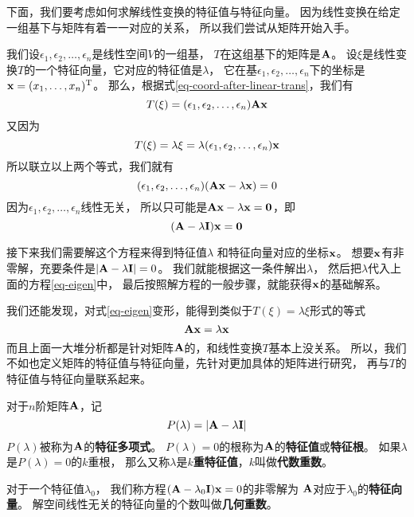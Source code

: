 下面，我们要考虑如何求解线性变换的特征值与特征向量。
因为线性变换在给定一组基下与矩阵有着一一对应的关系，
所以我们尝试从矩阵开始入手。

我们设$\epsilon_1,\epsilon_2,\dots,\epsilon_n$是线性空间$V$的一组基，
$T$在这组基下的矩阵是$\mathbf{A}$。
设$\xi$是线性变换$T$的一个特征向量，它对应的特征值是$\lambda$，
它在基$\epsilon_1,\epsilon_2,\dots,\epsilon_n$下的坐标是
$\mathbf{x}=(x_1,\dots,x_n)^{\textrm{T}}$。
那么，根据式\ref{eq-coord-after-linear-trans}，我们有
\[ T(\xi) = (\epsilon_1,\epsilon_2,\dots,\epsilon_n)\mathbf{A}\mathbf{x} \]
又因为
\[ T(\xi) = \lambda\xi = \lambda(\epsilon_1,\epsilon_2,\dots,\epsilon_n)\mathbf{x} \]
所以联立以上两个等式，我们就有
\begin{displaymath}
  (\epsilon_1,\epsilon_2,\dots,\epsilon_n)(\mathbf{A}\mathbf{x} - \lambda\mathbf{x})=0
\end{displaymath}
因为$\epsilon_1,\epsilon_2,\dots,\epsilon_n$线性无关，
所以只可能是$\mathbf{A}\mathbf{x} - \lambda\mathbf{x} = \mathbf{0}$，即
\begin{equation} \label{eq-eigen}
  (\mathbf{A} - \lambda\mathbf{I})\mathbf{x} = \mathbf{0}
\end{equation}

接下来我们需要解这个方程来得到特征值$\lambda$
和特征向量对应的坐标$\mathbf{x}$。
想要$\mathbf{x}$有非零解，充要条件是$|\mathbf{A} - \lambda\mathbf{I}| = 0$。
我们就能根据这一条件解出$\lambda$，
然后把$\lambda$代入上面的方程\ref{eq-eigen}中，
最后按照解方程的一般步骤，就能获得$\mathbf{x}$的基础解系。

我们还能发现，对式\ref{eq-eigen}变形，能得到类似于$T(\xi)=\lambda\xi$形式的等式
\begin{displaymath}
\mathbf{A}\mathbf{x}=\lambda\mathbf{x}
\end{displaymath}
而且上面一大堆分析都是针对矩阵$\mathbf{A}$的，和线性变换$T$基本上没关系。
所以，我们不如也定义矩阵的特征值与特征向量，先针对更加具体的矩阵进行研究，
再与$T$的特征值与特征向量联系起来。

\begin{definition}[矩阵的特征值和特征向量]
  对于$n$阶矩阵$\mathbf{A}$，记
  \[P(\lambda)=|\mathbf{A}-\lambda\mathbf{I}|\]
  $P(\lambda)$被称为$\mathbf{A}$的\textbf{特征多项式}。
  $P(\lambda)=0$的根称为$\mathbf{A}$的\textbf{特征值}或\textbf{特征根}。
  如果$\lambda$是$P(\lambda)=0$的$k$重根，
  那么又称$\lambda$是\textbf{$k$重特征值}，$k$叫做\textbf{代数重数}。

  对于一个特征值$\lambda_0$，
  我们称方程$(\mathbf{A}-\lambda_0\mathbf{I})\mathbf{x}=0$的非零解为
  $\mathbf{A}$对应于$\lambda_0$的\textbf{特征向量}。
  解空间线性无关的特征向量的个数叫做\textbf{几何重数}。
\end{definition}

